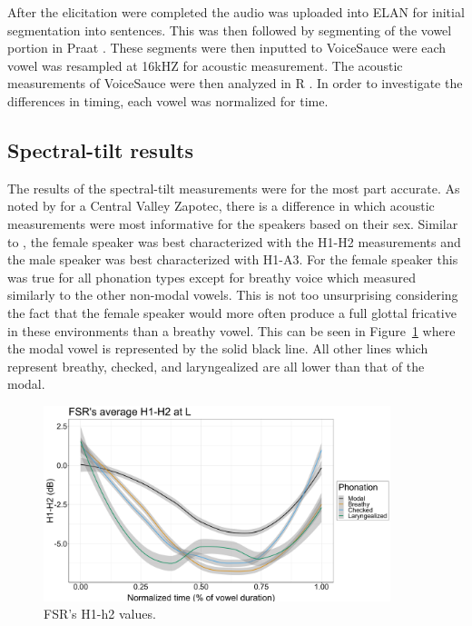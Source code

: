 \documentclass[12pt, letterpaper]{article}
\begin{document}
After the elicitation were completed the audio was uploaded into ELAN \citep{wittenburgELANProfessionalFramework2006} for initial segmentation into sentences. This was then followed by segmenting of the vowel portion in Praat \citep{boersmaPraatDoingPhonetics2021}. These segments were then inputted to VoiceSauce \citep{shueVOICESAUCEProgramVoice2009} were each vowel was resampled at 16kHZ for acoustic measurement. The acoustic measurements of VoiceSauce were then analyzed in R \citep{rcoreteamLanguageEnvironmentStatistical2021}. In order to investigate the differences in timing, each vowel was normalized for time.

\subsection{Spectral-tilt results} \label{sec:Results}

The results of the spectral-tilt measurements were for the most part accurate. As noted by \citet{espositoVariationContrastivePhonation2010} for a Central Valley Zapotec, there is a difference in which acoustic measurements were most informative for the speakers based on their sex. Similar to \citeauthor{espositoVariationContrastivePhonation2010}, the female speaker was best characterized with the H1-H2 measurements and the male speaker was best characterized with H1-A3. For the female speaker this was true for all phonation types except for breathy voice which measured similarly to the other non-modal vowels. This is not too unsurprising considering the fact that the female speaker would more often produce a full glottal fricative in these environments than a breathy vowel. This can be seen in Figure~\ref{fig:FSRh1h2} where the modal vowel is represented by the solid black line. All other lines which represent breathy, checked, and laryngealized are all lower than that of the modal. 
\begin{figure}[!ht]
	\includegraphics[width=0.9\textwidth]{../h1h2_line_L.png}
	\caption{FSR's H1-h2 values.}
	\label{fig:FSRh1h2} 
\end{figure}
\end{document}
